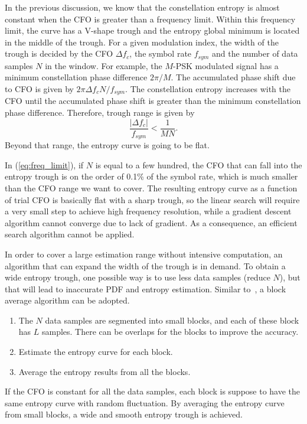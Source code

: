 \documentclass[journal,comsoc]{IEEEtran}
\begin{document}
In the previous discussion, we know that the constellation entropy is almost constant when the CFO is greater than a frequency limit.
Within this frequency limit, the curve has a V-shape trough and the entropy global minimum is located in the middle of the trough.
For a given modulation index, the width of the trough is decided by the CFO \(\Delta f_c\), the symbol rate $f_{sym}$ and the number of data samples $N$ in the window.
For example, the \(M\)-PSK modulated signal has a minimum constellation phase difference \(2\pi/M\).
The accumulated phase shift due to CFO is given by \(2\pi \Delta f_c N / f_{sym}\).
The constellation entropy increases with the CFO until the accumulated phase shift is greater than the minimum constellation phase difference. 
Therefore, trough range is given by
\begin{equation}
\frac{{\left| {\Delta {f_c}} \right|}}{{{f_{sym}}}} < \frac{1}{{MN}}.
\label{eq:freq_limit}
\end{equation}
Beyond that range, the entropy curve is going to be flat.


In (\ref{eq:freq_limit}), if \(N\) is equal to a few hundred, the CFO that can fall into the entropy trough is on the order of 0.1\% of the symbol rate, which is much smaller than the CFO range we want to cover.
The resulting entropy curve as a function of trial CFO is basically flat with a sharp trough, 
so the linear search will require a very small step to achieve high frequency resolution, while a gradient descent algorithm cannot converge due to lack of gradient.
As a consequence, an efficient search algorithm cannot be applied. 

In order to cover a large estimation range without intensive computation, an algorithm that can expand the width of the trough is in demand.
To obtain a wide entropy trough, one possible way is to use less data samples (reduce \(N\)), but that will lead to inaccurate PDF and entropy estimation.
Similar to~\cite{YuanlingHuang2007}, a block average algorithm can be adopted.
\begin{enumerate}
\item The \(N\) data samples are segmented into small blocks, and each of these block has \(L\) samples. There can be overlaps for the blocks to improve the accuracy.
\item Estimate the entropy curve for each block.
\item Average the entropy results from all the blocks.
\end{enumerate}
If the CFO is constant for all the data samples, each block is suppose to have the same entropy curve with random fluctuation.
By averaging the entropy curve from small blocks, a wide and smooth entropy trough is achieved.
\end{document}
